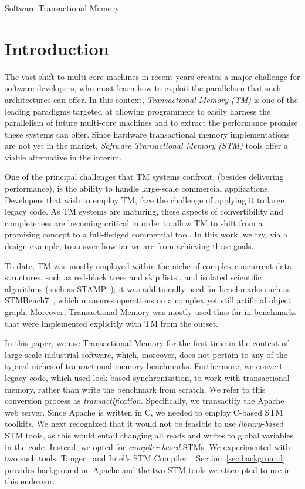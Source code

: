 \documentclass[11pt]{sigplanconf}
\let \cite = \citep
\begin{document}
\keywords
Software Transactional Memory

\section{Introduction}

The vast shift to multi-core machines in recent years 
creates a major challenge for software developers, 
who must learn how to exploit the parallelism that such
architectures can offer.
In this context, \emph{Transactional Memory (TM)} is one of the leading
paradigms targeted at allowing programmers to easily harness the 
parallelism of future multi-core machines and to extract the 
performance promise these systems can offer. 
Since hardware transactional memory implementations are not
yet in the market,  \emph{Software Transactional Memory (STM)} tools
offer a viable alternative in the interim. 

One of the principal challenges that TM systems confront, (besides 
delivering performance), is the ability to handle large-scale commercial applications.
Developers that wish to employ TM, face the challenge of 
applying it to large legacy code. As TM systems are maturing, these aspects of 
convertibility and completeness are becoming critical in order to allow TM to shift from 
a promising concept to a full-fledged commercial tool. In this work, we try, via a design 
example, to answer how far we are from achieving these goals. 

To date, TM was mostly employed within the niche of complex
concurrent data structures, such as red-black trees and skip lists
\cite{herlihy:DSTM, fraser:practical:thesis:2003}, and isolated scientific
algorithms (such as STAMP~\cite{caominh:stamp:iiswc:2008});
it was additionally used for  benchmarks such as
STMBench7~\cite{STMBench7}, which measures operations on a complex yet still
artificial object graph.
Moreover, Transactional Memory was mostly used thus far in benchmarks that 
were implemented explicitly with TM from the outset. 

In this paper, we use Transactional Memory
for the first time in the context of large-scale industrial software, which,
moreover, does not pertain to any of the typical niches of transactional memory
benchmarks. Furthermore, we convert legacy code, which used lock-based
synchronization, to work with transactional memory, rather than write the
benchmark from scratch. We refer to this conversion process as
\emph{transactification}. Specifically, we transactify the Apache 
web server. Since Apache is written in C, we needed to employ C-based
STM toolkits. We next recognized that it would not be feasible to
use \emph{library-based} STM tools, as this  
would entail changing all reads and writes to global variables in the code.
Instead, we opted for \emph{compiler-based} STMs. 
We experimented with two such tools, 
{\sc Tanger}~\cite{felber2007tanger} and Intel's STM Compiler~\cite{icc}.
Section~\ref{sec:background} provides background on Apache
and the two STM tools we attempted to use in this endeavor. 
\end{document}
